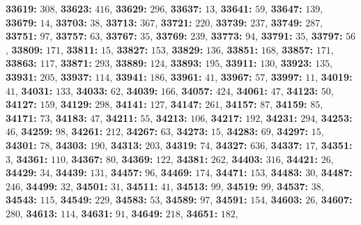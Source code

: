 \textsf{\bfseries 33619:} $308$, \textsf{\bfseries 33623:} $416$, \textsf{\bfseries 33629:} $296$, \textsf{\bfseries 33637:} $13$, \textsf{\bfseries 33641:} $59$, \textsf{\bfseries 33647:} $139$, \textsf{\bfseries 33679:} $14$, \textsf{\bfseries 33703:} $38$, \textsf{\bfseries 33713:} $367$, \textsf{\bfseries 33721:} $220$, \textsf{\bfseries 33739:} $237$, \textsf{\bfseries 33749:} $287$, \textsf{\bfseries 33751:} $97$, \textsf{\bfseries 33757:} $63$, \textsf{\bfseries 33767:} $35$, \textsf{\bfseries 33769:} $239$, \textsf{\bfseries 33773:} $94$, \textsf{\bfseries 33791:} $35$, \textsf{\bfseries 33797:} $56$, \textsf{\bfseries 33809:} $171$, \textsf{\bfseries 33811:} $15$, \textsf{\bfseries 33827:} $153$, \textsf{\bfseries 33829:} $136$, \textsf{\bfseries 33851:} $168$, \textsf{\bfseries 33857:} $171$, \textsf{\bfseries 33863:} $117$, \textsf{\bfseries 33871:} $293$, \textsf{\bfseries 33889:} $124$, \textsf{\bfseries 33893:} $195$, \textsf{\bfseries 33911:} $130$, \textsf{\bfseries 33923:} $135$, \textsf{\bfseries 33931:} $205$, \textsf{\bfseries 33937:} $114$, \textsf{\bfseries 33941:} $186$, \textsf{\bfseries 33961:} $41$, \textsf{\bfseries 33967:} $57$, \textsf{\bfseries 33997:} $11$, \textsf{\bfseries 34019:} $41$, \textsf{\bfseries 34031:} $133$, \textsf{\bfseries 34033:} $62$, \textsf{\bfseries 34039:} $166$, \textsf{\bfseries 34057:} $424$, \textsf{\bfseries 34061:} $47$, \textsf{\bfseries 34123:} $50$, \textsf{\bfseries 34127:} $159$, \textsf{\bfseries 34129:} $298$, \textsf{\bfseries 34141:} $127$, \textsf{\bfseries 34147:} $261$, \textsf{\bfseries 34157:} $87$, \textsf{\bfseries 34159:} $85$, \textsf{\bfseries 34171:} $73$, \textsf{\bfseries 34183:} $47$, \textsf{\bfseries 34211:} $55$, \textsf{\bfseries 34213:} $106$, \textsf{\bfseries 34217:} $192$, \textsf{\bfseries 34231:} $294$, \textsf{\bfseries 34253:} $46$, \textsf{\bfseries 34259:} $98$, \textsf{\bfseries 34261:} $212$, \textsf{\bfseries 34267:} $63$, \textsf{\bfseries 34273:} $15$, \textsf{\bfseries 34283:} $69$, \textsf{\bfseries 34297:} $15$, \textsf{\bfseries 34301:} $78$, \textsf{\bfseries 34303:} $190$, \textsf{\bfseries 34313:} $203$, \textsf{\bfseries 34319:} $74$, \textsf{\bfseries 34327:} $636$, \textsf{\bfseries 34337:} $17$, \textsf{\bfseries 34351:} $3$, \textsf{\bfseries 34361:} $110$, \textsf{\bfseries 34367:} $80$, \textsf{\bfseries 34369:} $122$, \textsf{\bfseries 34381:} $262$, \textsf{\bfseries 34403:} $316$, \textsf{\bfseries 34421:} $26$, \textsf{\bfseries 34429:} $34$, \textsf{\bfseries 34439:} $131$, \textsf{\bfseries 34457:} $96$, \textsf{\bfseries 34469:} $174$, \textsf{\bfseries 34471:} $153$, \textsf{\bfseries 34483:} $30$, \textsf{\bfseries 34487:} $246$, \textsf{\bfseries 34499:} $32$, \textsf{\bfseries 34501:} $31$, \textsf{\bfseries 34511:} $41$, \textsf{\bfseries 34513:} $99$, \textsf{\bfseries 34519:} $99$, \textsf{\bfseries 34537:} $38$, \textsf{\bfseries 34543:} $115$, \textsf{\bfseries 34549:} $229$, \textsf{\bfseries 34583:} $53$, \textsf{\bfseries 34589:} $97$, \textsf{\bfseries 34591:} $154$, \textsf{\bfseries 34603:} $26$, \textsf{\bfseries 34607:} $280$, \textsf{\bfseries 34613:} $114$, \textsf{\bfseries 34631:} $91$, \textsf{\bfseries 34649:} $218$, \textsf{\bfseries 34651:} $182$, 
